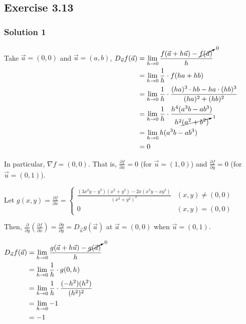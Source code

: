 {~~~}

\subsection*{Exercise 3.13}

\subsubsection*{Solution 1}

Take $\vec{a} = (0,0)$ and $\vec{u} = (a,b)$, 
$\begin{aligned}[t]
    D_{\vec{u}} f(\vec{a}) & = \lim_{h\to0} \frac{ f(\vec{a} + h\vec{u}) - \cancelto{0}{{f(\vec{a})}}}{h}               \\
                           & = \lim_{h\to0} \frac{1}{h} \cdot f(ha + hb)                                                \\
                           & = \lim_{h\to0} \frac{1}{h} \cdot \frac{(ha)^3 \cdot hb - ha \cdot (hb)^3}{(ha)^2 + (hb)^2} \\
                           & = \lim_{h\to0} \frac{1}{h} \cdot \frac{h^4(a^3b - ab^3)}{h^2\cancelto{1}{(a^2+b^2)}}       \\
                           & = \lim_{h\to0} h(a^3b - ab^3)                                                              \\
                           & = 0
\end{aligned}$

In particular, $\nabla f = (0,0)$. That is, $\frac{\partial f}{\partial x} = 0$ (for $\vec{u} = (1,0)$) and $\frac{\partial f}{\partial y} = 0$ (for $\vec{u} = (0,1)$).

Let $g(x,y) = \frac{\partial f}{\partial x} =
    \begin{cases}
        \frac{(3x^2y - y^3)(x^2 + y^2) - 2x(x^3y - xy^3)}{(x^2 + y^2)^2} & (x,y) \neq (0,0) \\
        0                                                                & (x,y) = (0,0)
    \end{cases}$

Then, $\frac{\partial}{\partial y}\left( \frac{\partial f}{\partial x} \right) = \frac{\partial g}{\partial y} = D_{\vec{u}} g(\vec{a})$ at $\vec{a} = (0,0)$ when $\vec{u} = (0,1)$. 

$\begin{aligned}[t]
    D_{\vec{u}} f(\vec{a}) & = \lim_{h\to0} \frac{g(\vec{a} + h\vec{u}) - \cancelto{0}{g(\vec{a})}}{h} \\
                           & = \lim_{h\to0} \frac{1}{h} \cdot g(0,h)                                   \\
                           & = \lim_{h\to0} \frac{1}{h} \cdot \frac{(-h^2)(h^2)}{(h^2)^2}              \\
                           & = \lim_{h\to0} -1                                                         \\
                           & = -1
\end{aligned}$

